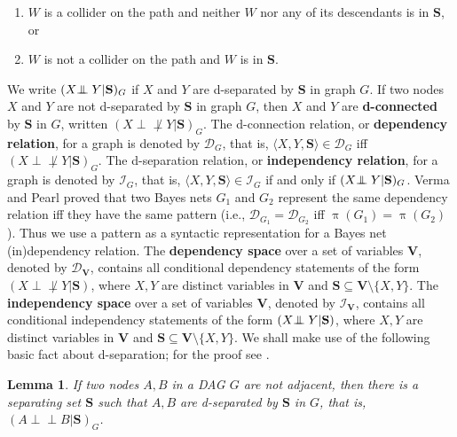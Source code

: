 \documentclass{elsarticle}%
\newtheorem{lemma}[theorem]{Lemma}
\DeclareMathOperator{\pattern}{\pi}
\newcommand{\indep}{\ensuremath{\perp{}\!\!\!\!\!\!\!\perp{}}}
\newcommand{\dep}{\ensuremath{{\perp{}\!\!\!\!\!\!\!\not  \perp{}}}}
\renewcommand{\S}{\mathbf{{S}}}
\newcommand{\A}{A}
\newcommand{\B}{B}
\newcommand{\X}{X}
\newcommand{\Y}{Y}
\newcommand{\G}{G}
\newcommand{\D}{\mathcal{D}}
\newcommand{\I}{\mathcal{I}}
\begin{document}
\begin{enumerate}
\item $W$ is a collider on the path and neither $W$ nor any of its descendants is in $\S$, or 
\item $W$ is not a collider on the path and $W$ is in $\S$.
\end{enumerate}
We write $(X \protect{\indep} Y| \S)_G$ if $X$ and $Y$ are d-separated by $\S$ in graph
$G$. If two nodes $X$ and $Y$ are not d-separated by $\S$ in graph $G$, then
$X$ and $Y$ are {\bf d-connected} by $\S$ in $G$, written $(X \dep Y|
\S)_G$. The d-connection relation, or \textbf{dependency relation}, for a graph is denoted by $\D_{G}$, that is, $\langle X,Y,\mathbf{S} \rangle \in \D_{G}$ iff $(X \dep Y|\mathbf{S})_{G}$. The d-separation relation, or \textbf{independency relation}, for a graph is denoted by $\I_{G}$, that is, $\langle X,Y,\mathbf{S} \rangle \in \I_{G}$ if and only if $(\X \protect{\indep}
\Y| \S)_G$. 
Verma and Pearl proved that two Bayes nets $G_1$
and $G_2$ represent the same dependency relation iff they have the same pattern
(i.e., $\D_{G_1} = \D_{G_2} $ iff $\pattern(G_1)=\pattern(G_2)$
\cite[Thm. 1]{verma90:_equiv_synth_causal_model}). Thus we use a pattern as a syntactic representation for a Bayes net (in)dependency relation.
The \textbf{dependency space} over a set of variables $\mathbf{V}$, denoted by
$\D_{\mathbf{V}}$, contains all conditional dependency statements of the form
$(X\dep Y|\mathbf{S})$, where $X,Y$ are
distinct variables in $\mathbf{V}$ and $\mathbf{S}\subseteq\mathbf{V}%
\setminus\{X,Y\}$. The \textbf{independency space} over a set of variables $\mathbf{V}$, denoted by
$\I_{\mathbf{V}}$, contains all conditional independency statements of the form
$(X \protect{\indep} Y|\mathbf{S})$, where $X,Y$ are
distinct variables in $\mathbf{V}$ and $\mathbf{S}\subseteq\mathbf{V}%
\setminus\{X,Y\}$. 
We shall make use of the following basic fact about d-separation; for the proof see \cite[Cor. 3.4]{pearl88:_probab_reason_intel_system}.
\begin{lemma} \label{lemma:d-sep}
If two nodes $\A,\B$ in a DAG $\G$ are not adjacent, then
there is a separating set $\S$
such that $\A,\B$ are d-separated by $\S$ in $\G$, that is, $(\A \indep \B|\S)_{\G}$.
\end{lemma}
 
\end{document}
